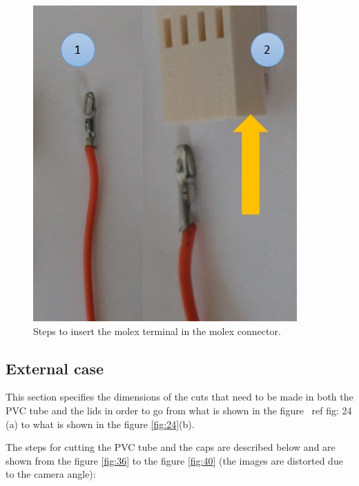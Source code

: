 \documentclass[12pt,letterpaper]{article}
\numberwithin{figure}{section}
\numberwithin{equation}{section}
\numberwithin{table}{section}
\begin{document}
\begin{figure}[H]
    \centering
    \includegraphics[scale=0.6]{Figuras/figure_35.jpg}
    \caption{Steps to insert the molex terminal in the molex connector.}
    \label{fig:35}
\end{figure}

\subsection{External case}

This section specifies the dimensions of the cuts that need to be made in both the PVC tube and the lids in order to go from what is shown in the figure \ ref {fig: 24} (a) to what is shown in the figure \ref{fig:24}(b).

The steps for cutting the PVC tube and the caps are described below and are shown from the figure \ref{fig:36} to the figure \ref{fig:40} (the images are distorted due to the camera angle):
\end{document}
